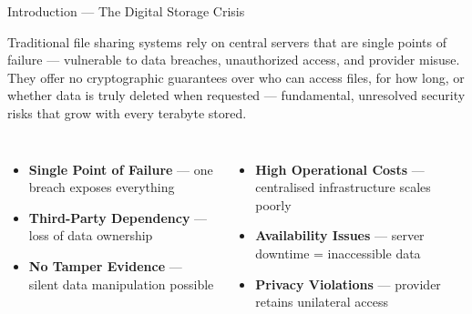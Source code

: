 \documentclass[aspectratio=169]{beamer}
\begin{document}
\begin{frame}{Introduction --- The Digital Storage Crisis}
\begin{tcolorbox}[redbox, title=\textbf{Core Problem}]
\small
Traditional file sharing systems rely on central servers that are single points of failure ---
vulnerable to data breaches, unauthorized access, and provider misuse. They offer no
cryptographic guarantees over who can access files, for how long, or whether data is truly
deleted when requested --- fundamental, unresolved security risks that grow with every
terabyte stored.
\end{tcolorbox}
\vspace{0.18cm}
\begin{tcolorbox}[bluebox, title=\textbf{Limitations of Centralised Storage}]
\scriptsize
\begin{columns}[t]
\begin{itemize}
  \item \textbf{Single Point of Failure} --- one breach exposes everything
  \item \textbf{Third-Party Dependency} --- loss of data ownership
  \item \textbf{No Tamper Evidence} --- silent data manipulation possible
\end{itemize}
\begin{itemize}
  \item \textbf{High Operational Costs} --- centralised infrastructure scales poorly
  \item \textbf{Availability Issues} --- server downtime = inaccessible data
  \item \textbf{Privacy Violations} --- provider retains unilateral access
\end{itemize}
\end{columns}
\end{tcolorbox}
\end{frame}
\end{document}
